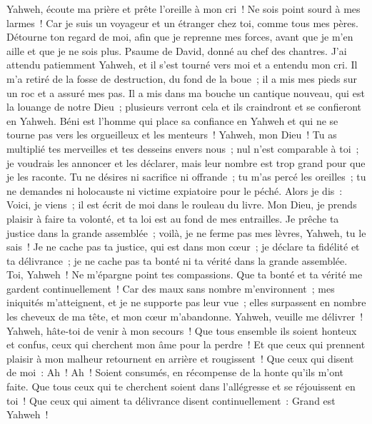 \begin{multicols}{2}
Yahweh, écoute ma prière et prête l'oreille à mon cri~! Ne sois point sourd à mes larmes~! Car je suis un voyageur et un étranger chez toi, comme tous mes pères.
Détourne ton regard de moi, afin que je reprenne mes forces, avant que je m'en aille et que je ne sois plus.
\VerseOne{}Psaume de David, donné au chef des chantres.
J'ai attendu patiemment Yahweh, et il s'est tourné vers moi et a entendu mon cri.
Il m'a retiré de la fosse de destruction, du fond de la boue~; il a mis mes pieds sur un roc et a assuré mes pas.
Il a mis dans ma bouche un cantique nouveau, qui est la louange de notre Dieu~; plusieurs verront cela et ils craindront et se confieront en Yahweh.
Béni est l'homme qui place sa confiance en Yahweh et qui ne se tourne pas vers les orgueilleux et les menteurs~!
Yahweh, mon Dieu~! Tu as multiplié tes merveilles et tes desseins envers nous~; nul n'est comparable à toi~; je voudrais les annoncer et les déclarer, mais leur nombre est trop grand pour que je les raconte.
Tu ne désires ni sacrifice ni offrande~; tu m'as percé les oreilles~; tu ne demandes ni holocauste ni victime expiatoire pour le péché.
Alors je dis~: Voici, je viens~; il est écrit de moi dans le rouleau du livre.
Mon Dieu, je prends plaisir à faire ta volonté, et ta loi est au fond de mes entrailles.
Je prêche ta justice dans la grande assemblée~; voilà, je ne ferme pas mes lèvres, Yahweh, tu le sais~!
Je ne cache pas ta justice, qui est dans mon cœur~; je déclare ta fidélité et ta délivrance~; je ne cache pas ta bonté ni ta vérité dans la grande assemblée.
Toi, Yahweh~! Ne m'épargne point tes compassions. Que ta bonté et ta vérité me gardent continuellement~!
Car des maux sans nombre m'environnent~; mes iniquités m'atteignent, et je ne supporte pas leur vue~; elles surpassent en nombre les cheveux de ma tête, et mon cœur m'abandonne.
Yahweh, veuille me délivrer~! Yahweh, hâte-toi de venir à mon secours~!
Que tous ensemble ils soient honteux et confus, ceux qui cherchent mon âme pour la perdre~! Et que ceux qui prennent plaisir à mon malheur retournent en arrière et rougissent~!
Que ceux qui disent de moi~: Ah~! Ah~! Soient consumés, en récompense de la honte qu'ils m'ont faite.
Que tous ceux qui te cherchent soient dans l'allégresse et se réjouissent en toi~! Que ceux qui aiment ta délivrance disent continuellement~: Grand est Yahweh~!

\end{multicols}

